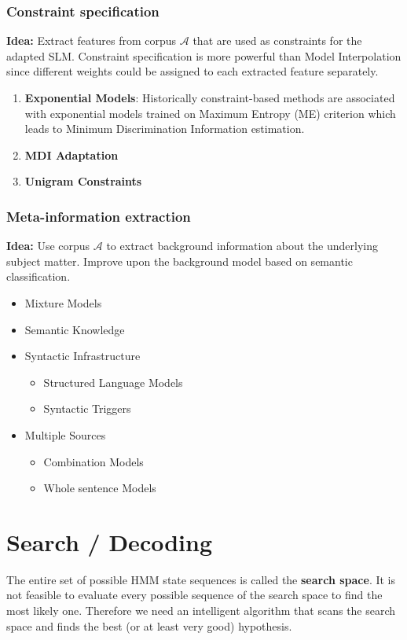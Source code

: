 \subsubsection{Constraint specification}
\textbf{Idea:} Extract features from corpus $\mathcal{A}$ that are used as constraints for the adapted SLM.
Constraint specification is more powerful than Model Interpolation since different weights could be assigned to each extracted feature separately.
\begin{enumerate}
\item \textbf{Exponential Models}: Historically constraint-based methods are associated with exponential models trained on Maximum Entropy (ME) criterion which leads to Minimum Discrimination Information estimation.
\item \textbf{MDI Adaptation}
\item \textbf{Unigram Constraints}
\end{enumerate}


\subsubsection{Meta-information extraction}
\textbf{Idea:} Use corpus $\mathcal{A}$ to extract background information about the underlying subject matter. Improve upon the background model based on semantic classification.
\begin{itemize}
\item Mixture Models
\item Semantic Knowledge
\item Syntactic Infrastructure
\begin{itemize}
\item Structured Language Models
\item Syntactic Triggers
\end{itemize}
\item Multiple Sources
\begin{itemize}
\item Combination Models
\item Whole sentence Models
\end{itemize}
\end{itemize}

\newpage

\section{Search / Decoding}

The entire set of possible HMM state sequences is called the \textbf{search space}. It is not feasible to evaluate every possible sequence of the search space to find the most likely one. Therefore we need an intelligent algorithm that scans the search space and finds the best (or at least very good) hypothesis. \\

